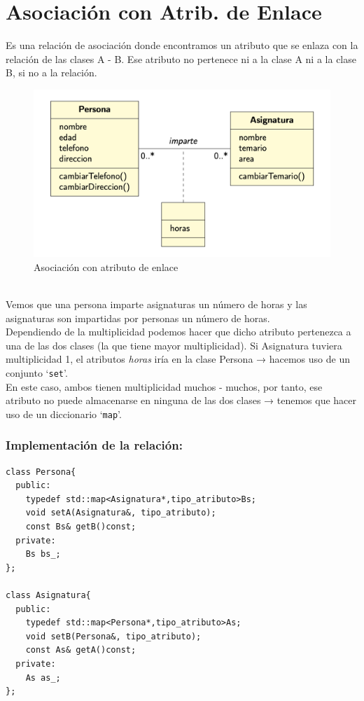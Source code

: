 \chapter{Asociación con Atrib. de Enlace}
Es una relación de asociación donde encontramos un atributo que se enlaza con la relación de las clases A - B.
Ese atributo no pertenece ni a la clase A ni a la clase B, si no a la relación.
\begin{figure}[h]
	\centering
	\includegraphics[width=\textwidth]{Imagenes/atribenlace.png}
	\caption{Asociación con atributo de enlace}
\end{figure}
\\
Vemos que una persona imparte asignaturas un número de horas y las asignaturas son impartidas por personas un número de horas.\vspace*{0.2cm}\\
Dependiendo de la multiplicidad podemos hacer que dicho atributo pertenezca a una de las dos clases (la que tiene mayor multiplicidad).\vspace*{0.2cm}
Si Asignatura tuviera multiplicidad 1, el atributos \textit{horas} iría en la clase Persona → hacemos uso de un conjunto ‘\texttt{set}’.\vspace*{0.2cm}\\
En este caso, ambos tienen multiplicidad muchos - muchos, por tanto, ese atributo no puede almacenarse en ninguna de las dos clases → tenemos que hacer uso de un diccionario ‘\texttt{map}’.
\newpage
\subsection{Implementación de la relación:}

\begin{lstlisting}[frame=single]
class Persona{
  public:
    typedef std::map<Asignatura*,tipo_atributo>Bs;
    void setA(Asignatura&, tipo_atributo);
    const Bs& getB()const;
  private:
    Bs bs_;
};

class Asignatura{
  public:
    typedef std::map<Persona*,tipo_atributo>As;
    void setB(Persona&, tipo_atributo);
    const As& getA()const;
  private:
    As as_;
};
\end{lstlisting}
